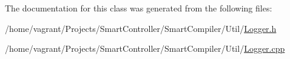 The documentation for this class was generated from the following files\+:\begin{DoxyCompactItemize}
\item 
/home/vagrant/\+Projects/\+Smart\+Controller/\+Smart\+Compiler/\+Util/\hyperlink{_logger_8h}{Logger.\+h}\item 
/home/vagrant/\+Projects/\+Smart\+Controller/\+Smart\+Compiler/\+Util/\hyperlink{_logger_8cpp}{Logger.\+cpp}\end{DoxyCompactItemize}
